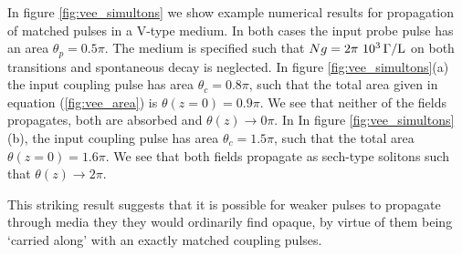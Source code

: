     In figure \ref{fig:vee_simultons} we show example numerical results for
    propagation of matched pulses in a V-type medium. In both cases the input
    probe pulse has an area $\theta_p = 0.5 \pi$. The medium is specified such
    that $Ng = \unit[2\pi~10^3]{\Gamma/L}$ on both transitions and spontaneous
    decay is neglected. In figure \ref{fig:vee_simultons}(a) the input coupling
    pulse has area $\theta_c = 0.8 \pi$, such that the total area given in
    equation (\ref{fig:vee_area}) is $\theta(z{=}0) = 0.9 \pi$. We see that
    neither of the fields propagates, both are absorbed and $\theta(z)
    \rightarrow 0 \pi$. In In figure \ref{fig:vee_simultons}(b), the input
    coupling pulse has area $\theta_c = 1.5 \pi$, such that the total area
    $\theta(z{=}0) = 1.6 \pi$. We see that both fields propagate as sech-type
    solitons such that $\theta(z) \rightarrow 2 \pi$.

    This striking result suggests that it is possible for weaker pulses to
    propagate through media they they would ordinarily find opaque, by virtue of
    them being `carried along' with an exactly matched coupling pulses.

